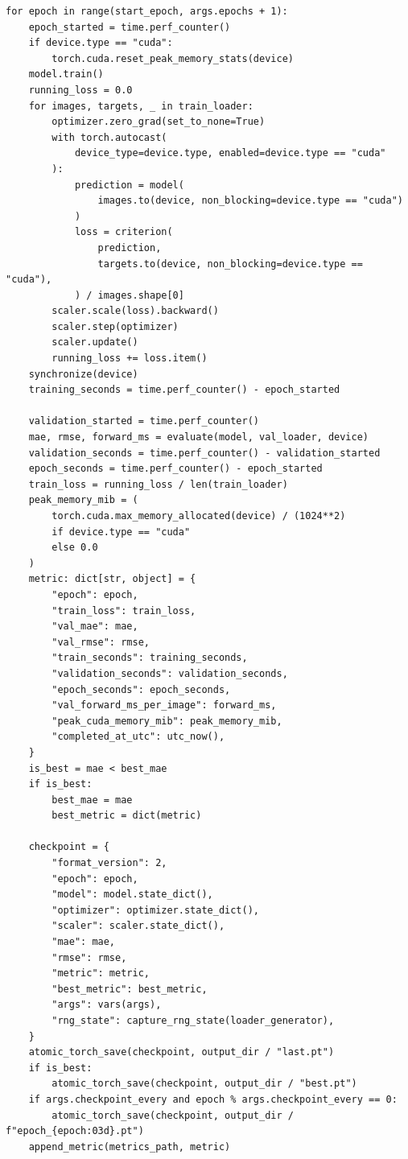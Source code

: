 \begin{verbatim}
for epoch in range(start_epoch, args.epochs + 1):
    epoch_started = time.perf_counter()
    if device.type == "cuda":
        torch.cuda.reset_peak_memory_stats(device)
    model.train()
    running_loss = 0.0
    for images, targets, _ in train_loader:
        optimizer.zero_grad(set_to_none=True)
        with torch.autocast(
            device_type=device.type, enabled=device.type == "cuda"
        ):
            prediction = model(
                images.to(device, non_blocking=device.type == "cuda")
            )
            loss = criterion(
                prediction,
                targets.to(device, non_blocking=device.type == "cuda"),
            ) / images.shape[0]
        scaler.scale(loss).backward()
        scaler.step(optimizer)
        scaler.update()
        running_loss += loss.item()
    synchronize(device)
    training_seconds = time.perf_counter() - epoch_started

    validation_started = time.perf_counter()
    mae, rmse, forward_ms = evaluate(model, val_loader, device)
    validation_seconds = time.perf_counter() - validation_started
    epoch_seconds = time.perf_counter() - epoch_started
    train_loss = running_loss / len(train_loader)
    peak_memory_mib = (
        torch.cuda.max_memory_allocated(device) / (1024**2)
        if device.type == "cuda"
        else 0.0
    )
    metric: dict[str, object] = {
        "epoch": epoch,
        "train_loss": train_loss,
        "val_mae": mae,
        "val_rmse": rmse,
        "train_seconds": training_seconds,
        "validation_seconds": validation_seconds,
        "epoch_seconds": epoch_seconds,
        "val_forward_ms_per_image": forward_ms,
        "peak_cuda_memory_mib": peak_memory_mib,
        "completed_at_utc": utc_now(),
    }
    is_best = mae < best_mae
    if is_best:
        best_mae = mae
        best_metric = dict(metric)

    checkpoint = {
        "format_version": 2,
        "epoch": epoch,
        "model": model.state_dict(),
        "optimizer": optimizer.state_dict(),
        "scaler": scaler.state_dict(),
        "mae": mae,
        "rmse": rmse,
        "metric": metric,
        "best_metric": best_metric,
        "args": vars(args),
        "rng_state": capture_rng_state(loader_generator),
    }
    atomic_torch_save(checkpoint, output_dir / "last.pt")
    if is_best:
        atomic_torch_save(checkpoint, output_dir / "best.pt")
    if args.checkpoint_every and epoch % args.checkpoint_every == 0:
        atomic_torch_save(checkpoint, output_dir / f"epoch_{epoch:03d}.pt")
    append_metric(metrics_path, metric)
\end{verbatim}

